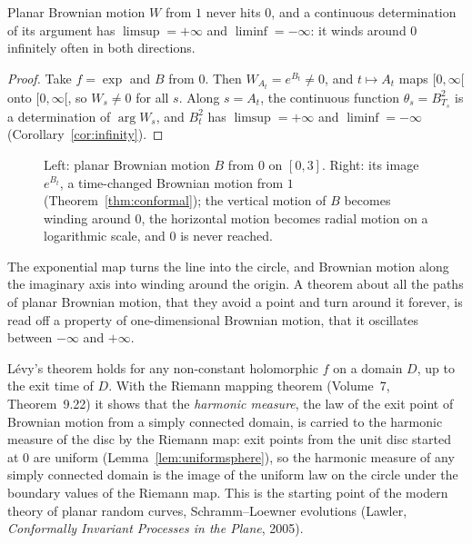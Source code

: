 \begin{corollary}[L\'evy]\label{cor:winding}
Planar Brownian motion $W$ from $1$ never hits $0$, and a continuous determination of its argument has $\limsup=+\infty$ and $\liminf=-\infty$: it winds around $0$ infinitely often in both directions.
\end{corollary}

\begin{proof}
Take $f=\exp$ and $B$ from $0$. Then $W_{A_t}=e^{B_t}\ne0$, and $t\mapsto A_t$ maps $[0,\infty[$ onto $[0,\infty[$, so $W_s\ne0$ for all $s$. Along $s=A_t$, the continuous function $\theta_s=B^2_{T_s}$ is a determination of
$\arg W_s$, and $B^2_t$ has $\limsup=+\infty$ and $\liminf=-\infty$ (Corollary~\ref{cor:infinity}).
\end{proof}

\begin{figure}[ht]
\centering
{}
\caption{Left: planar Brownian motion $B$ from $0$ on $[0,3]$. Right: its image $e^{B_t}$, a time-changed Brownian motion from $1$ (Theorem~\ref{thm:conformal}); the vertical motion of $B$ becomes winding around
$0$, the horizontal motion becomes radial motion on a logarithmic scale, and $0$ is never reached.}
\label{fig:winding}
\end{figure}

\begin{beauty}
The exponential map turns the line into the circle, and Brownian motion along the imaginary axis into winding around the origin. A theorem about all the paths of planar Brownian motion, that they avoid a point and
turn around it forever, is read off a property of one-dimensional Brownian motion, that it oscillates between $-\infty$ and $+\infty$.
\end{beauty}

\begin{remark}
L\'evy's theorem holds for any non-constant holomorphic $f$ on a domain $D$, up to the exit time of $D$. With the Riemann mapping theorem (Volume~7, Theorem~9.22) it shows that the \emph{harmonic measure}, the law of the
exit point of Brownian motion from a simply connected domain, is carried to the harmonic measure of the disc by the Riemann map: exit points from the unit disc started at $0$ are uniform (Lemma~\ref{lem:uniformsphere}), so the
harmonic measure of any simply connected domain is the image of the uniform law on the circle under the boundary values of the Riemann map. This is the starting point of the modern theory of planar random curves,
Schramm--Loewner evolutions (Lawler, \emph{Conformally Invariant Processes in the Plane}, 2005).
\end{remark}

